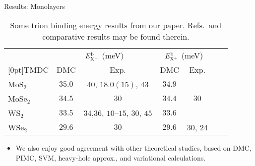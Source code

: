 \documentclass[12pt, pdf, hyperref={draft}, usenames, dvipsnames]{beamer}
\begin{document}
\begin{frame}{Results: Monolayers}

\begin{table}[H]
  \centering
\begin{tabular}{lcccccc}
\hline \hline
& \multicolumn{2}{c}{$E_{\rm X^-}^{\rm b}$
  (meV)} & \multicolumn{2}{c}{$E_{\rm
    X^+}^{\rm b}$ (meV)} \\
\raisebox{1.5ex}[0pt]{TMDC} & DMC&
Exp. &
DMC & Exp. \\ \hline

MoS$_2$ & $35.0$ &
$40$, $18.0(15)$, $43$
& $34.9$ & \\

MoSe$_2$ & $34.5$ &
$30$ & $34.4$ &
$30$ \\

WS$_2$ & $33.5$ &
$34$,$36$,
$10$--$15$, $30$,
$45$ & $33.6$ & & \\

WSe$_2$ & $29.6$ &
$30$ & $29.6$ &
$30$, $24$ \\

\hline \hline
\end{tabular}
\caption{Some trion binding energy results from our paper. Refs.\ and comparative results may be found
therein.}\label{tab:trion_results}
\end{table}

\begin{itemize}
  \item We also enjoy good agreement with other theoretical studies, based on
  DMC, PIMC, SVM, heavy-hole approx., and variational calculations.
\end{itemize}

\end{frame}
\end{document}
